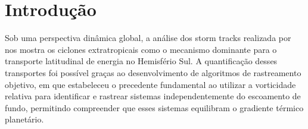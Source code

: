 \chapter{Introdução} \label{ch:introduccion}


Sob uma perspectiva dinâmica global, a análise dos storm tracks realizada por \citet{hoskins2005new} nos mostra os ciclones extratropicais como o mecanismo dominante para o transporte latitudinal de energia no Hemisfério Sul. A quantificação desses transportes foi possível graças ao desenvolvimento de algoritmos de rastreamento objetivo, em que \citet{sinclair1994objective} estabeleceu o precedente fundamental ao utilizar a vorticidade relativa para identificar e rastrear sistemas independentemente do escoamento de fundo, permitindo compreender que esses sistemas equilibram o gradiente térmico planetário.

